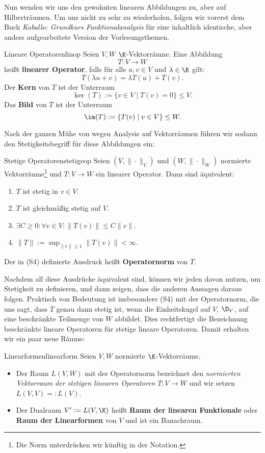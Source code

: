 Nun wenden wir uns den gewohnten linearen Abbildungen zu, aber auf Hilberträumen. Um uns nicht zu sehr zu wiederholen, folgen wir vorerst dem Buch \textit{Kaballo: Grundkurs Funktionalanalysis} für eine inhaltlich identische, aber anders aufgearbeitete Version der Vorlesungsthemen.
\begin{definition}{Lineare Operatoren}{linop}
Seien $V,W$ $\K$-Vektorräume. Eine Abbildung
\[
T: V \to W
\]
heißt \textbf{linearer Operator}, falls für alle $u,v \in V$ und $\lambda \in \K$ gilt:
\[
T(\lambda u + v)= \lambda T(u)+T(v).
\]
Der \textbf{Kern} von $T$ ist der Unterraum
\[
\ker(T):= \{v \in V \mid T(v)=0\} \leq V.
\]
Das \textbf{Bild} von $T$ ist der Unterraum
\[
\im(T):= \{T(v) \mid v \in V\} \leq W.
\]
\end{definition}
Nach der ganzen Mühe von wegen Analysis auf Vektorräumen führen wir sodann den Stetigkeitsbegriff für diese Abbildungen ein:
\begin{definition}{Stetige Operatoren}{stetigeop}
Seien $(V,\|\cdot\|_V)$ und $(W,\|\cdot\|_W)$ normierte Vektorräume\footnote{Die Norm unterdrücken wir künftig in der Notation.} und $T: V \to W$ ein linearer Operator. Dann sind äquivalent:
\begin{enumerate}[({S}1)]
	\item $T$ ist stetig in $v \in V$.
	\item $T$ ist gleichmäßig stetig auf $V$.
	\item $\exists C \geq 0: \forall v \in V: \|T(v)\| \leq C \|v\|$.
	\item $\|T\| := \sup_{\|v\| \leq 1} \| T(v) \| < \infty.$
\end{enumerate}
Der in (S4) definierte Ausdruck heißt \textbf{Operatornorm} von $T$.
\end{definition}
Nachdem all diese Ausdrücke äquivalent sind, können wir jeden davon nutzen, um Stetigkeit zu definieren, und dann zeigen, dass die anderen Aussagen daraus folgen. Praktisch von Bedeutung ist insbesondere (S4) mit der Operatornorm, die uns sagt, dass $T$ genau dann stetig ist, wenn die Einheitskugel auf $V$, $\D_V$, auf eine beschränkte Teilmenge von $W$ abbildet. Dies rechtfertigt die Bezeichnung beschränkte lineare Operatoren für stetige lineare Operatoren. Damit erhalten wir ein paar neue Räume:
\begin{definition}{Linearformen}{linearform}
Seien $V,W$ normierte $\K$-Vektorräume.
\begin{itemize}
	\item Der Raum $L(V,W)$ mit der Operatornorm bezeichnet den \textit{normierten Vektorraum der stetigen linearen Operatoren} $T: V \to W$ und wir setzen $L(V,V)=:L(V)$.
	\item Der Dualraum $V':=L(V, \K)$ heißt \textbf{Raum der linearen Funktionale} oder \textbf{Raum der Linearformen} von $V$ und ist ein Banachraum.
\end{itemize}
\end{definition}
